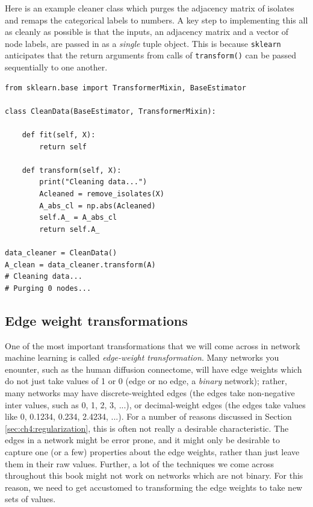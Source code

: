 Here is an example cleaner class which purges the adjacency matrix of isolates and remaps the categorical labels to numbers. A key step to implementing this all as cleanly as possible is that the inputs, an adjacency matrix and a vector of node labels, are passed in as a \emph{single} tuple object. This is because \texttt{sklearn} anticipates that the return arguments from calls of \texttt{transform()} can be passed sequentially to one another.

\begin{lstlisting}[style=python]
from sklearn.base import TransformerMixin, BaseEstimator

class CleanData(BaseEstimator, TransformerMixin):

    def fit(self, X):
        return self

    def transform(self, X):
        print("Cleaning data...")
        Acleaned = remove_isolates(X)
        A_abs_cl = np.abs(Acleaned)
        self.A_ = A_abs_cl
        return self.A_

data_cleaner = CleanData()
A_clean = data_cleaner.transform(A)
# Cleaning data...
# Purging 0 nodes...
\end{lstlisting}

\subsection{Edge weight transformations}

One of the most important transformations that we will come across in network machine learning is called \emph{edge-weight transformation}. Many networks you enounter, such as the human diffusion connectome, will have edge weights which do not just take values of 1 or 0 (edge or no edge, a \emph{binary} network); rather, many networks may have discrete-weighted edges (the edges take non-negative inter values, such as 0, 1, 2, 3, ...), or decimal-weight edges (the edges take values like 0, 0.1234, 0.234, 2.4234, ...). For a number of reasons discussed in Section \ref{sec:ch4:regularization}, this is often not really a desirable characteristic.  The edges in a network might be error prone, and it might only be desirable to capture one (or a few) properties about the edge weights, rather than just leave them in their raw values. Further, a lot of the techniques we come across throughout this book might not work on networks which are not binary. For this reason, we need to get accustomed to transforming the edge weights to take new sets of values.

